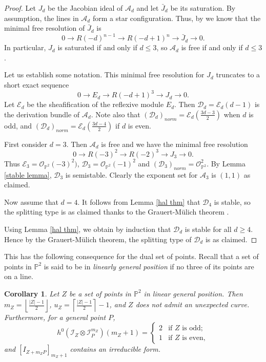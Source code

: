 \documentclass[12pt]{amsart}
\numberwithin{equation}{section}
\newtheorem{corollary}[theorem]{Corollary}
\theoremstyle{definition}
\begin{document}
\begin{proof}

Let $J_{d}$ be the Jacobian ideal of $\mathcal A_{d}$ and let $\bar J_{d}$ be its saturation.  By assumption, the lines in $\mathcal A_{d}$ form a star configuration. Thus, by  \cite{GHM} we know that the minimal free resolution of $\bar J_{d}$ is 
\[
0 \rightarrow R(-d)^{n-1} \rightarrow R(-d+1)^{n} \rightarrow \bar J_{d} \rightarrow 0.
\]
In particular, $J_{d}$ is saturated if and only if $d \leq 3$, so $\mathcal A_d$ is free if and only if $d \leq 3$.

Let us establish some notation.  This minimal free resolution for $J_d$ truncates to a short exact sequence
\[
0 \rightarrow E_d \rightarrow R(-d+1)^3 \rightarrow J_d \rightarrow 0.
\]
Let $\mathcal E_d$ be the sheafification of the reflexive module $E_d $.  Then $\mathcal D_d = \mathcal E_d(d-1)$ is the derivation bundle of  $\mathcal A_d$.  Note also that $(\mathcal D_d)_{norm} = \mathcal E_d(\frac{3d-3}{2})$ when $d$ is odd, and $(\mathcal D_d)_{norm} = \mathcal E_d(\frac{3d-4}{2})$ if $d$ is even.  

First consider $d = 3$.  Then $\mathcal A_{d}$ is free and we have the minimal free resolution
\[
0 \rightarrow R(-3)^2 \rightarrow R(-2)^3 \rightarrow J_3 \rightarrow 0.
\]
Thus $\mathcal E_3 = \mathcal O_{\mathbb P^2}(-3)^2)$, $\mathcal D_3 = \mathcal O_{\mathbb P^2}(-1)^2$ and $(\mathcal  D_3)_{norm} = \mathcal O_{\mathbb P^2}^2$.  By Lemma \ref{stable lemma}, $\mathcal D_3$ is semistable.
Clearly the exponent set for $\mathcal A_3$ is $(1,1)$ as claimed.  

Now assume that $d = 4$.  It  follows from Lemma \ref{hal thm} that $\mathcal D_4$ is stable, so the splitting type is as claimed thanks to the Grauert-M\"ulich theorem \cite{GM}.

Using Lemma \ref{hal thm}, we obtain by induction that $\mathcal D_d$ is stable for all $d \geq 4$.  Hence by the Grauert-M\"ulich theorem, the splitting type of $\mathcal D_d$ is as claimed.
\end{proof} 

This has the following consequence for the dual set of points. Recall that a set of points in ${ \ensuremath{\mathbb{P}}}^2$ is said to be in \emph{linearly general position} if no three of its points are on a line. 

\begin{corollary} 
      \label{cor:dZ lin gen position} 
Let $Z$ be a set of  points in $\mathbb P^2$ in linear general position.  Then 
$m_Z = \left \lfloor \frac{|Z|-1}{2} \right \rfloor$, $u_Z = \left \lceil\frac{|Z|-1}{2} \right \rceil - 1$,  and   $Z$ does not admit an unexpected curve. Furthermore, for a general point $P$,   
\[
h^0(\mathcal I_Z \otimes \mathcal I_P^{m_Z})(m_Z+1) = \begin{cases}
2 & \text{if $Z$ is odd}; \\
1 & \text{if $Z$ is even},  
\end{cases}
\]
and $[I_{Z + m_Z P}]_{m_Z +1}$ contains an irreducible form. 
\end{corollary}
\end{document}
